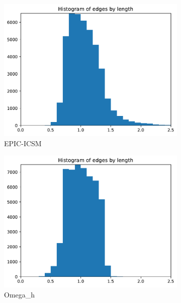 \documentclass[3p,times,procedia,number]{elsarticle}
\begin{document}
\begin{figure}
\begin{subfigure}{.16\textwidth}
\includegraphics[width=\textwidth]{epic-icsm-cube-cylinder-linear-length.pdf}
\caption{EPIC-ICSM}
\end{subfigure}
\begin{subfigure}{.16\textwidth}
\centering
\includegraphics[width=\textwidth]{omega_h-cube-cylinder-linear-length.pdf}
\caption{Omega\_h}
\end{subfigure}
\begin{subfigure}{.16\textwidth}
\centering

\end{subfigure}
\end{figure}
\end{document}
